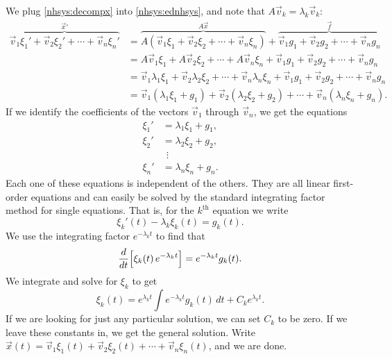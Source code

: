 We plug \eqref{nhsys:decompx} into \eqref{nhsys:ednhsys}, and note that
$A \vec{v}_k = \lambda_k \vec{v}_k$:
\begin{equation*}
\begin{split}
\overbrace{
\vec{v}_1 \xi_1' + 
\vec{v}_2 \xi_2' + \cdots +
\vec{v}_n \xi_n'
}^{{\vec{x}}'}
& =
\overbrace{
A \left( \vec{v}_1 \xi_1 + 
\vec{v}_2 \xi_2 + \cdots +
\vec{v}_n \xi_n \right)
}^{A\vec{x}}
+
\overbrace{
\vec{v}_1 g_1 + 
\vec{v}_2 g_2 + \cdots +
\vec{v}_n g_n
}^{\vec{f}}
\\
& = 
A \vec{v}_1 \xi_1 + 
A \vec{v}_2 \xi_2 + \cdots +
A \vec{v}_n \xi_n
+
\vec{v}_1 g_1 + 
\vec{v}_2 g_2 + \cdots +
\vec{v}_n g_n
\\
& =
\vec{v}_1 \lambda_1 \xi_1 + 
\vec{v}_2 \lambda_2 \xi_2 + \cdots +
\vec{v}_n \lambda_n \xi_n
+
\vec{v}_1 g_1 + 
\vec{v}_2 g_2 + \cdots +
\vec{v}_n g_n
\\
& =
\vec{v}_1 ( \lambda_1 \xi_1 + g_1 ) +
\vec{v}_2 ( \lambda_2 \xi_2 + g_2 ) + \cdots + 
\vec{v}_n ( \lambda_n \xi_n + g_n ) .
\end{split}
\end{equation*}
If we identify the coefficients of the vectors $\vec{v}_1$ through
$\vec{v}_n$, we get the
equations
\begin{align*}
\xi_1' & = \lambda_1 \xi_1 + g_1 , \\
\xi_2' & = \lambda_2 \xi_2 + g_2 , \\
& ~~ \vdots \\
\xi_n' & = \lambda_n \xi_n + g_n .
\end{align*}
Each one of these equations is independent of the others.  They are all
linear first-order equations and can easily be solved by the standard
integrating factor method for single equations.
That is, for the $k^{\text{th}}$
equation we write
\begin{equation*}
\xi_k'(t) - \lambda_k \xi_k(t) = g_k(t) .
\end{equation*}
We use the integrating factor $e^{-\lambda_k t}$ to find that
\begin{equation*}
\frac{d}{dt}\Bigl[ \xi_k(t) \, e^{-\lambda_k t} \Bigr] = 
e^{-\lambda_k t} g_k(t) .
\end{equation*}
We integrate and solve for $\xi_k$ to get
\begin{equation*}
\xi_k(t) =  e^{\lambda_k t} 
\int e^{-\lambda_k t} g_k(t) \,dt + C_k e^{\lambda_k t} .
\end{equation*}
If we are looking for just any particular solution, we can set
$C_k$ to be zero.  If we leave these constants in, we get the
general solution.  Write
$\vec{x}(t) =
\vec{v}_1 \xi_1(t) + 
\vec{v}_2 \xi_2(t) + \cdots +
\vec{v}_n \xi_n(t)$, and we are done.

